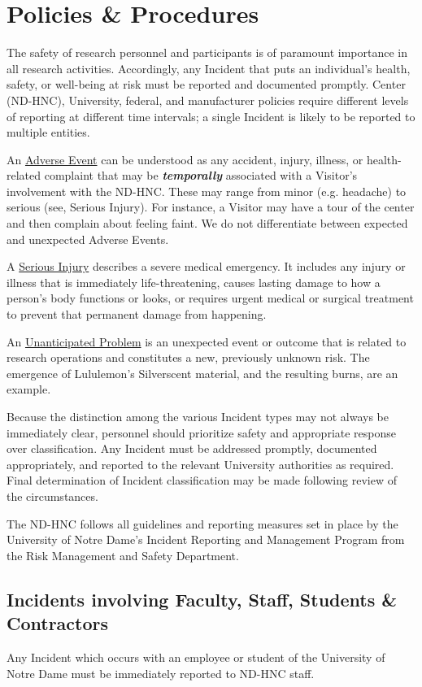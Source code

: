 \documentclass[11pt]{article}
\begin{document}
\section{Policies \& Procedures}

The safety of research personnel and participants is of paramount importance in all research activities. Accordingly, any Incident that puts an individual's health, safety, or well-being at risk must be reported and documented promptly. Center (ND-HNC), University, federal, and manufacturer policies require different levels of reporting at different time intervals; a single Incident is likely to be reported to multiple entities.

An \uline{Adverse Event} can be understood as any accident, injury, illness, or health-related complaint that may be \textit{\textbf{temporally}} associated with a Visitor's involvement with the ND-HNC. These may range from minor (e.g. headache) to serious (see, Serious Injury). For instance, a Visitor may have a tour of the center and then complain about feeling faint. We do not differentiate between expected and unexpected Adverse Events.

A \uline{Serious Injury} describes a severe medical emergency. It includes any injury or illness that is immediately life-threatening, causes lasting damage to how a person's body functions or looks, or requires urgent medical or surgical treatment to prevent that permanent damage from happening.

An \uline{Unanticipated Problem} is an unexpected event or outcome that is related to research operations and constitutes a new, previously unknown risk. The emergence of Lululemon's Silverscent material, and the resulting burns, are an example.

Because the distinction among the various Incident types may not always be immediately clear, personnel should prioritize safety and appropriate response over classification. Any Incident must be addressed promptly, documented appropriately, and reported to the relevant University authorities as required. Final determination of Incident classification may be made following review of the circumstances.

The ND-HNC follows all guidelines and reporting measures set in place by the University of Notre Dame's Incident Reporting and Management Program from the Risk Management and Safety Department\cite{riskman}.

%
\subsection{Incidents involving Faculty, Staff, Students \& Contractors}
\label{ssec:policy-staff}
Any Incident which occurs with an employee or student of the University of Notre Dame must be immediately reported to ND-HNC staff.
\end{document}
